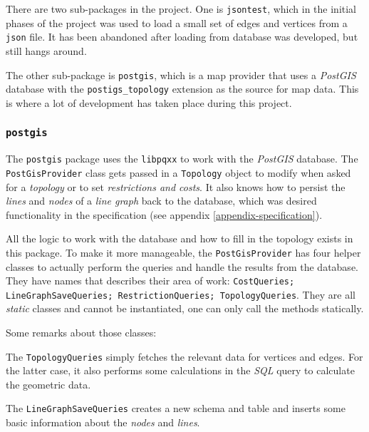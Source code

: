 \documentclass[../main.tex]{subfiles}
\begin{document}
There are two sub-packages in the project. One is \texttt{jsontest}, which in the initial phases of the project was used to load a small set of edges and vertices from a \texttt{json} file. It has been abandoned after loading from database was developed, but still hangs around.

The other sub-package is \texttt{postgis}, which is a map provider that uses a \textit{PostGIS} database with the \texttt{postigs\_topology} extension as the source for map data. This is where a lot of development has taken place during this project.

\subsubsection{\texttt{postgis}}
The \texttt{postgis} package uses the \texttt{libpqxx} to work with the \textit{PostGIS} database. The \texttt{PostGisProvider} class gets passed in a \texttt{Topology} object to modify when asked for a \textit{topology} or to set \textit{restrictions and costs}. It also knows how to persist the \textit{lines} and \textit{nodes} of a \textit{line graph} back to the database, which was desired functionality in the specification (see appendix \ref{appendix-specification}).

All the logic to work with the database and how to fill in the topology exists in this package. To make it more manageable, the \texttt{PostGisProvider} has four helper classes to actually perform the queries and handle the results from the database. They have names that describes their area of work: \texttt{CostQueries; LineGraphSaveQueries; RestrictionQueries; TopologyQueries}. They are all \textit{static} classes and cannot be instantiated, one can only call the methods statically.

Some remarks about those classes:

The \texttt{TopologyQueries} simply fetches the relevant data for vertices and edges. For the latter case, it also performs some calculations in the \textit{SQL} query to calculate the geometric data.

The \texttt{LineGraphSaveQueries} creates a new schema and table and inserts some basic information about the \textit{nodes} and \textit{lines}.
\end{document}
